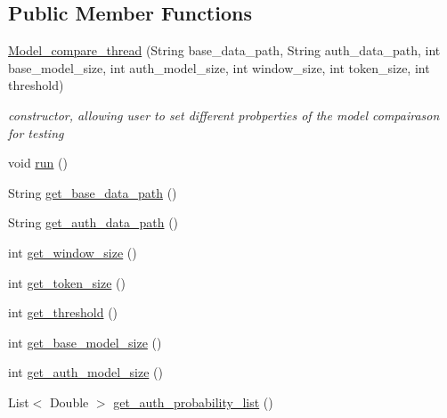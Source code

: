 \subsection*{Public Member Functions}
\begin{DoxyCompactItemize}
\item 
\hyperlink{classdata__analysis_1_1_model__compare__thread_a0ee9d1dece56959345e6c0e369b06e38}{Model\+\_\+compare\+\_\+thread} (String base\+\_\+data\+\_\+path, String auth\+\_\+data\+\_\+path, int base\+\_\+model\+\_\+size, int auth\+\_\+model\+\_\+size, int window\+\_\+size, int token\+\_\+size, int threshold)
\begin{DoxyCompactList}\small\item\em constructor, allowing user to set different probperties of the model compairason for testing \end{DoxyCompactList}\item 
void \hyperlink{classdata__analysis_1_1_model__compare__thread_ad75761fec2f2e5e2dd2679b6a120f2a4}{run} ()
\item 
String \hyperlink{classdata__analysis_1_1_model__compare__thread_af3bfecb6b0ad04d38fcfa2d4a0c69866}{get\+\_\+base\+\_\+data\+\_\+path} ()
\item 
String \hyperlink{classdata__analysis_1_1_model__compare__thread_a2b890e51f20cbea9ee865d5baae689a7}{get\+\_\+auth\+\_\+data\+\_\+path} ()
\item 
int \hyperlink{classdata__analysis_1_1_model__compare__thread_a268439415f6bd1f912cbcff8af77b636}{get\+\_\+window\+\_\+size} ()
\item 
int \hyperlink{classdata__analysis_1_1_model__compare__thread_a7d81e3cf81f4222d4da104d9429b578e}{get\+\_\+token\+\_\+size} ()
\item 
int \hyperlink{classdata__analysis_1_1_model__compare__thread_a59482784f581ddbaf509bf81cc0c249b}{get\+\_\+threshold} ()
\item 
int \hyperlink{classdata__analysis_1_1_model__compare__thread_a963240b77cca8d407e93fc733f0aed7c}{get\+\_\+base\+\_\+model\+\_\+size} ()
\item 
int \hyperlink{classdata__analysis_1_1_model__compare__thread_a22c1e624e263f61b4d9dee5fb60dd1b8}{get\+\_\+auth\+\_\+model\+\_\+size} ()
\item 
List$<$ Double $>$ \hyperlink{classdata__analysis_1_1_model__compare__thread_af0dbf695248868d7bb401be50f45b386}{get\+\_\+auth\+\_\+probability\+\_\+list} ()
\end{DoxyCompactItemize}
